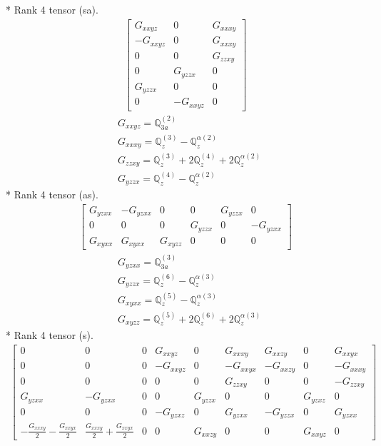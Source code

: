 \documentclass[fleqn,8pt,landscape]{jsarticle}
\begin{document}
* Rank 4 tensor (sa).
\begin{align*}
\begin{bmatrix} G_{xxyz} & 0 & G_{xxxy} \\ - G_{xxyz} & 0 & G_{xxxy} \\ 0 & 0 & G_{zzxy} \\ 0 & G_{yzzx} & 0 \\ G_{yzzx} & 0 & 0 \\ 0 & - G_{xxyz} & 0 \end{bmatrix}
\end{align*}
\begin{align*}
& G_{xxyz} = \mathbb{Q}_{3a}^{(2)} \\
& G_{xxxy} = \mathbb{Q}_{z}^{(3)} - \mathbb{Q}_{z}^{\alpha(2)} \\
& G_{zzxy} = \mathbb{Q}_{z}^{(3)} + 2 \mathbb{Q}_{z}^{(4)} + 2 \mathbb{Q}_{z}^{\alpha(2)} \\
& G_{yzzx} = \mathbb{Q}_{z}^{(4)} - \mathbb{Q}_{z}^{\alpha(2)}
\end{align*}
* Rank 4 tensor (as).
\begin{align*}
\begin{bmatrix} G_{yzxx} & - G_{yzxx} & 0 & 0 & G_{yzzx} & 0 \\ 0 & 0 & 0 & G_{yzzx} & 0 & - G_{yzxx} \\ G_{xyxx} & G_{xyxx} & G_{xyzz} & 0 & 0 & 0 \end{bmatrix}
\end{align*}
\begin{align*}
& G_{yzxx} = \mathbb{Q}_{3a}^{(3)} \\
& G_{yzzx} = \mathbb{Q}_{z}^{(6)} - \mathbb{Q}_{z}^{\alpha(3)} \\
& G_{xyxx} = \mathbb{Q}_{z}^{(5)} - \mathbb{Q}_{z}^{\alpha(3)} \\
& G_{xyzz} = \mathbb{Q}_{z}^{(5)} + 2 \mathbb{Q}_{z}^{(6)} + 2 \mathbb{Q}_{z}^{\alpha(3)}
\end{align*}
* Rank 4 tensor (s).
\begin{align*}
\begin{bmatrix} 0 & 0 & 0 & G_{xxyz} & 0 & G_{xxxy} & G_{xxzy} & 0 & G_{xxyx} \\ 0 & 0 & 0 & - G_{xxyz} & 0 & - G_{xxyx} & - G_{xxzy} & 0 & - G_{xxxy} \\ 0 & 0 & 0 & 0 & 0 & G_{zzxy} & 0 & 0 & - G_{zzxy} \\ G_{yzxx} & - G_{yzxx} & 0 & 0 & G_{yzzx} & 0 & 0 & G_{yzxz} & 0 \\ 0 & 0 & 0 & - G_{yzxz} & 0 & G_{yzxx} & - G_{yzzx} & 0 & G_{yzxx} \\ - \frac{G_{xxxy}}{2} - \frac{G_{xxyx}}{2} & \frac{G_{xxxy}}{2} + \frac{G_{xxyx}}{2} & 0 & 0 & G_{xxzy} & 0 & 0 & G_{xxyz} & 0 \end{bmatrix}
\end{align*}
\end{document}
